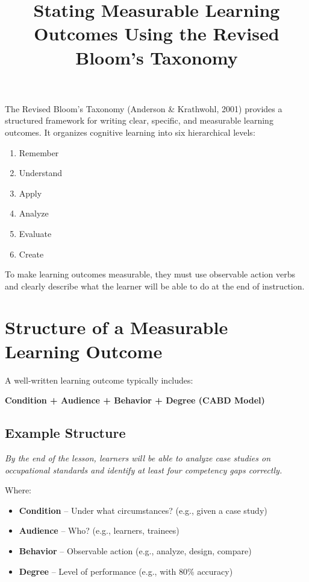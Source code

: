 \documentclass[12pt]{article}
\title{Stating Measurable Learning Outcomes Using the Revised Bloom's Taxonomy}
\date{}
\begin{document}
\maketitle

The Revised Bloom's Taxonomy (Anderson \& Krathwohl, 2001) provides a structured framework for writing clear, specific, and measurable learning outcomes. It organizes cognitive learning into six hierarchical levels:

\begin{enumerate}
    \item Remember
    \item Understand
    \item Apply
    \item Analyze
    \item Evaluate
    \item Create
\end{enumerate}

To make learning outcomes measurable, they must use observable action verbs and clearly describe what the learner will be able to do at the end of instruction.

\section{Structure of a Measurable Learning Outcome}

A well-written learning outcome typically includes:

\textbf{Condition + Audience + Behavior + Degree (CABD Model)}

\subsection*{Example Structure}

\textit{By the end of the lesson, learners will be able to analyze case studies on occupational standards and identify at least four competency gaps correctly.}

\vspace{0.3cm}

Where:

\begin{itemize}
    \item \textbf{Condition} -- Under what circumstances? (e.g., given a case study)
    \item \textbf{Audience} -- Who? (e.g., learners, trainees)
    \item \textbf{Behavior} -- Observable action (e.g., analyze, design, compare)
    \item \textbf{Degree} -- Level of performance (e.g., with 80\% accuracy)
\end{itemize}
\end{document}
